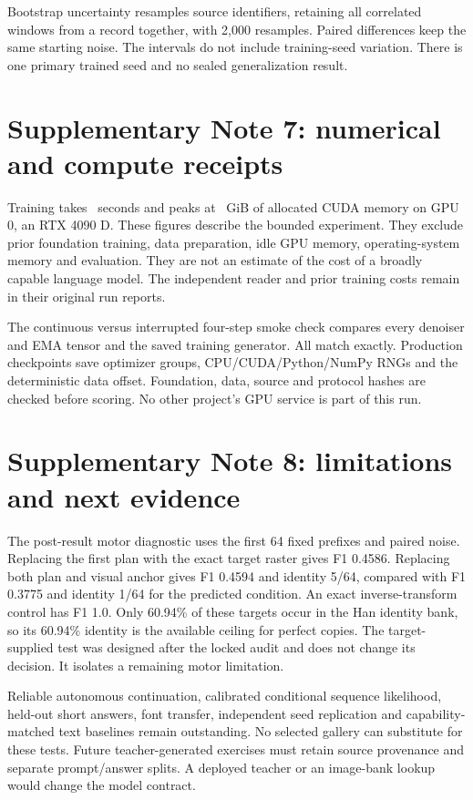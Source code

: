 \documentclass[10pt,a4paper]{article}
\begin{document}
Bootstrap uncertainty resamples source identifiers, retaining all correlated
windows from a record together, with 2,000 resamples. Paired differences keep
the same starting noise. The intervals do not include training-seed variation.
There is one primary trained seed and no sealed generalization result.



\section*{Supplementary Note 7: numerical and compute receipts}
Training takes \TrainSeconds\ seconds and peaks at \TrainMemory\ GiB of
allocated CUDA memory on GPU 0, an RTX 4090 D. These figures describe the
bounded experiment. They exclude prior foundation training, data preparation,
idle GPU memory, operating-system memory and evaluation. They are not an
estimate of the cost of a broadly capable language model. The independent
reader and prior training costs remain in their original run reports.

The continuous versus interrupted four-step smoke check compares every
denoiser and EMA tensor and the saved training generator. All match exactly.
Production checkpoints save optimizer groups, CPU/CUDA/Python/NumPy RNGs and
the deterministic data offset. Foundation, data, source and protocol hashes
are checked before scoring. No other project's GPU service is part of this run.

\section*{Supplementary Note 8: limitations and next evidence}
The post-result motor diagnostic uses the first 64 fixed prefixes and paired
noise. Replacing the first plan with the exact target raster gives F1 0.4586.
Replacing both plan and visual anchor gives F1 0.4594 and identity 5/64,
compared with F1 0.3775 and identity 1/64 for the predicted condition. An exact
inverse-transform control has F1 1.0. Only 60.94\% of these targets occur in
the Han identity bank, so its 60.94\% identity is the available ceiling for
perfect copies. The target-supplied test was designed after the locked audit
and does not change its decision. It isolates a remaining motor limitation.

Reliable autonomous continuation, calibrated conditional sequence likelihood,
held-out short answers, font transfer, independent seed replication and
capability-matched text baselines remain outstanding. No selected gallery can
substitute for these tests. Future teacher-generated exercises must retain
source provenance and separate prompt/answer splits. A deployed teacher or
an image-bank lookup would change the model contract.
\end{document}
